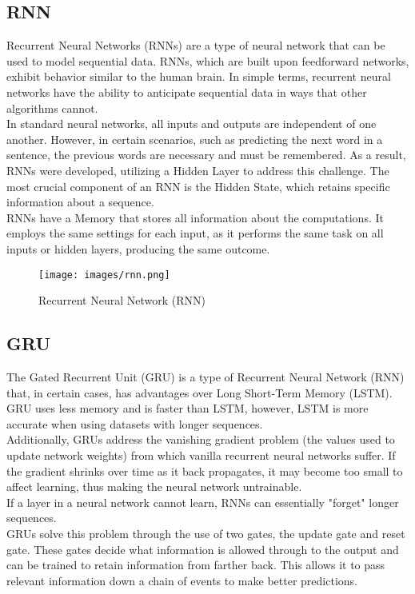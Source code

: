 \documentclass{ieeeojies}
\begin{document}
\subsection{RNN}
\indent Recurrent Neural Networks (RNNs) are a type of neural network that can be used to model sequential data. RNNs, which are built upon feedforward networks, exhibit behavior similar to the human brain. In simple terms, recurrent neural networks have the ability to anticipate sequential data in ways that other algorithms cannot.
\\
\indent In standard neural networks, all inputs and outputs are independent of one another. However, in certain scenarios, such as predicting the next word in a sentence, the previous words are necessary and must be remembered. As a result, RNNs were developed, utilizing a Hidden Layer to address this challenge. The most crucial component of an RNN is the Hidden State, which retains specific information about a sequence.
\\
\indent RNNs have a Memory that stores all information about the computations. It employs the same settings for each input, as it performs the same task on all inputs or hidden layers, producing the same outcome. \cite{b14}

\begin{figure}[H]
    \centering
    \begin{minipage}{0.28\textwidth}
    \centering
    \texttt{[image: images/rnn.png]}
    \caption{Recurrent Neural Network (RNN)}
    \label{fig:1}
    \end{minipage}
\end{figure}

\subsection{GRU}
\indent The Gated Recurrent Unit (GRU) \cite{b15} is a type of Recurrent Neural Network (RNN) that, in certain cases, has advantages over Long Short-Term Memory (LSTM). GRU uses less memory and is faster than LSTM, however, LSTM is more accurate when using datasets with longer sequences.
\\
\indent Additionally, GRUs address the vanishing gradient problem (the values used to update network weights) from which vanilla recurrent neural networks suffer. If the gradient shrinks over time as it back propagates, it may become too small to affect learning, thus making the neural network untrainable.
\\
\indent If a layer in a neural network cannot learn, RNNs can essentially "forget" longer sequences.
\\
\indent GRUs solve this problem through the use of two gates, the update gate and reset gate. These gates decide what information is allowed through to the output and can be trained to retain information from farther back. This allows it to pass relevant information down a chain of events to make better predictions.
\end{document}
